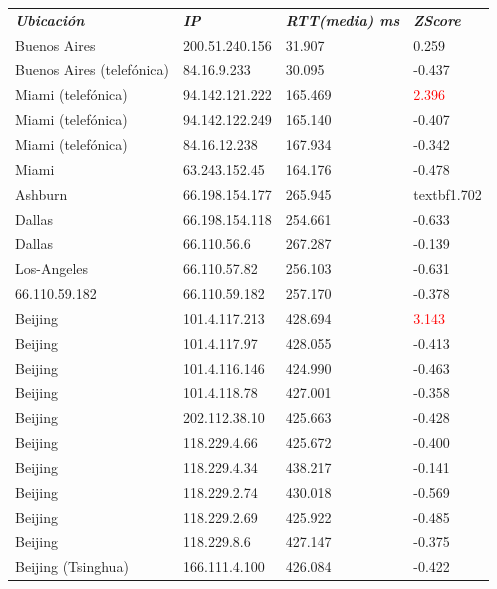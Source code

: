 \begin{tabular}{llll}
	\textit{\textbf{Ubicaci\'on}}	&	\textit{\textbf{IP}}	&	\textit{\textbf{RTT(media) ms}}	&	\textit{\textbf{ZScore}}	\\
	Buenos Aires	&	200.51.240.156	&	31.907	&	0.259	\\
	Buenos Aires (telef\'onica)	&	84.16.9.233	&	30.095	&	-0.437	\\
	Miami (telef\'onica)		&	94.142.121.222	&	165.469	&	\textcolor{red}{2.396}	\\
	Miami (telef\'onica)		&	94.142.122.249	&	165.140	&	-0.407	\\
	Miami (telef\'onica)		&	84.16.12.238	&	167.934	&	-0.342	\\
	Miami 			&	63.243.152.45	&	164.176	&	-0.478	\\
	Ashburn			&	66.198.154.177	&	265.945	&	textbf{1.702}	\\
	Dallas			&	66.198.154.118	&	254.661	&	-0.633	\\
	Dallas			&	66.110.56.6	&	267.287	&	-0.139	\\
	Los-Angeles		&	66.110.57.82	&	256.103	&	-0.631	\\
	66.110.59.182		&	66.110.59.182	&	257.170	&	-0.378	\\
	Beijing			&	101.4.117.213	&	428.694	&	\textcolor{red}{3.143}	\\
	Beijing			&	101.4.117.97	&	428.055	&	-0.413	\\
	Beijing			&	101.4.116.146	&	424.990	&	-0.463	\\
	Beijing			&	101.4.118.78	&	427.001	&	-0.358	\\
	Beijing			&	202.112.38.10	&	425.663	&	-0.428	\\
	Beijing			&	118.229.4.66	&	425.672	&	-0.400	\\
	Beijing			&	118.229.4.34	&	438.217	&	-0.141	\\
	Beijing			&	118.229.2.74	&	430.018	&	-0.569	\\
	Beijing			&	118.229.2.69	&	425.922	&	-0.485	\\
	Beijing			&	118.229.8.6	&	427.147	&	-0.375	\\
	Beijing (Tsinghua)		&	166.111.4.100	&	426.084	&	-0.422	\\

\end{tabular}

~

